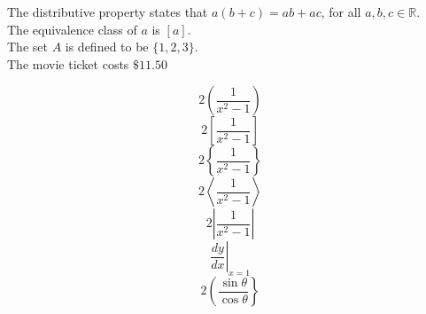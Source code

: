 \documentclass{article}
\begin{document}
The distributive property states that $a(b+c)=ab+ac$, for all $a, b, c \in \mathbb{R}$.\\[6pt]
The equivalence class of $a$ is $[a]$.\\[6pt]
The set $A$ is defined to be $\{1, 2, 3\}$.\\[6pt]
The movie ticket costs $\$11.50$

$$2\left(\frac{1}{x^2-1}\right)$$
$$2\left[\frac{1}{x^2-1}\right]$$
$$2\left\lbrace\frac{1}{x^2-1}\right\rbrace$$
$$2\left\langle\frac{1}{x^2-1}\right\rangle$$
$$2\left|\frac{1}{x^2-1}\right|$$
$$\left.\frac{dy}{dx}\right|_{x=1}$$ %
$$2\left(\frac{\sin\theta}{\cos\theta}\right\rbrace$$
\end{document}
